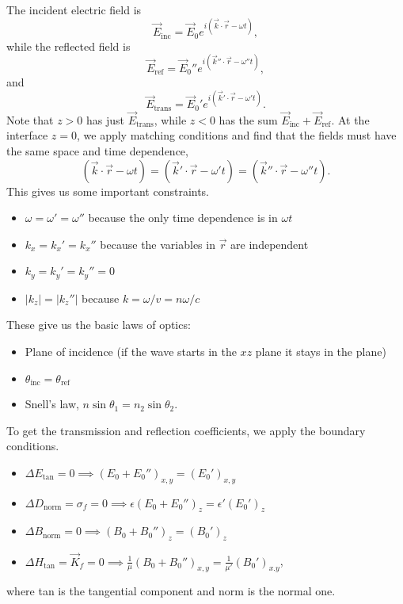 The incident electric field is
\begin{equation}
    \vec E_\text{inc} = \vec E_0 e^{i(\vec k \cdot \vec r - \omega t)},
\end{equation}
while the reflected field is
\begin{equation}
    \vec E_\text{ref} = \vec E_0'' e^{i(\vec k'' \cdot \vec r - \omega'' t)},
\end{equation}
and
\begin{equation}
    \vec E_\text{trans} = \vec E_0' e^{i(\vec k' \cdot \vec r - \omega't)}.
\end{equation}
Note that $z>0$ has just $\vec E_\text{trans}$, while $z<0$ has the sum $\vec E_\text{inc}+\vec E_\text{ref}$. At the interface $z=0$, we apply matching conditions and find that the fields must have the same space and time dependence,
\begin{equation}
    (\vec k \cdot \vec r - \omega t)=(\vec k' \cdot \vec r - \omega' t)=(\vec k'' \cdot \vec r - \omega'' t).
\end{equation}
This gives us some important constraints.
\begin{itemize}
    \item $\omega = \omega'=\omega''$ because the only time dependence is in $\omega t$
    \item $k_x=k_x'=k_x''$ because the variables in $\vec r$ are independent
    \item $k_y =k_y'=k_y''=0$
    \item $|k_z|=|k_z''|$ because $k=\omega/v = n\omega/c$
\end{itemize}
These give us the basic laws of optics:
\begin{itemize}
    \item Plane of incidence (if the wave starts in the $xz$ plane it stays in the plane)
    \item $\theta_\text{inc} = \theta_\text{ref}$
    \item Snell's law, $n\sin\theta_1 = n_2 \sin\theta_2$.
\end{itemize}

To get the transmission and reflection coefficients, we apply the boundary conditions.
\begin{itemize}
    \item $\Delta E_\text{tan}=0\implies (E_0+E_0'')_{x,y}=(E_0')_{x,y}$
    \item $\Delta D_\text{norm}=\sigma_f=0 \implies \epsilon(E_0 + E_0'')_z =\epsilon'(E_0')_z$
    \item $\Delta B_\text{norm}=0\implies (B_0+B_0'')_z = (B_0')_z$
    \item $\Delta H_\text{tan} = \vec K_f =0 \implies \frac{1}{\mu}(B_0+B_0'')_{x,y}= \frac{1}{\mu'}(B_0')_{x.y}$,
\end{itemize}
where tan is the tangential component and norm is the normal one.


